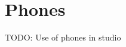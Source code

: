 \documentclass[../StudioOperationGuide.tex]{subfiles}
\begin{document}
\chapter{Phones}
TODO: Use of phones in studio
\end{document}
